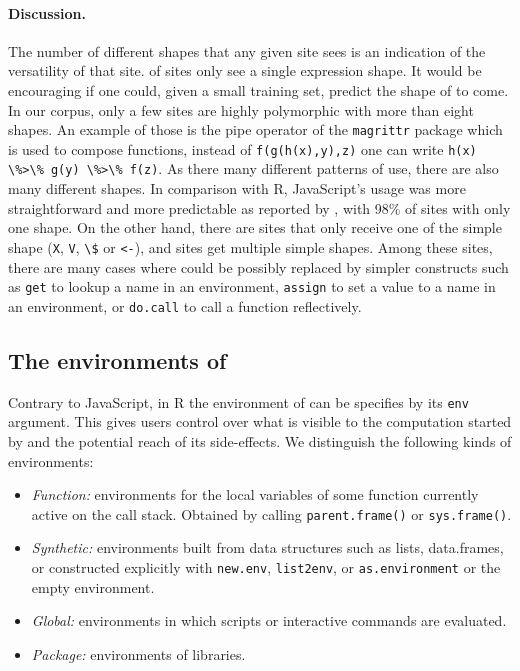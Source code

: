 \documentclass[screen,acmsmall]{acmart}%
\renewcommand{\k}[1]{\lstinline |#1|\xspace}
\begin{document}
\paragraph{Discussion.} The number of different shapes that any given
\eval site sees is an indication of the versatility of that site.
\packageNbOneMinimizedPercent of sites only see a single expression shape. It
would be encouraging if one could, given a small training set, predict the shape
of \evals to come. In our corpus, only a few sites are highly polymorphic with
more than eight shapes. An example of those is the pipe operator of the
\k{magrittr} package which is used to compose functions, \eg instead of
\k{f(g(h(x),y),z)} one can write \k{h(x) \%>\% g(y) \%>\% f(z)}. As there many
different patterns of use, there are also many different shapes. In comparison
with R, JavaScript's \eval usage was more straightforward and more predictable
as reported by \citet{oopsla12b}, with 98\% of sites with only one shape. On the
other hand, there are \packageNbSimpleMinimizedOne sites that only receive one
of the simple shape (\ie\xspace \k{X}, \k{V}, \k{\$} or \k{<-}), and
\packageNbSimpleMinimizedMore sites get multiple simple shapes. Among these
sites, there are many cases where \eval could be possibly replaced by simpler constructs
such as \k{get} to lookup a name in an environment, \k{assign} to set a value to
a name in an environment, or \k{do.call} to call a function reflectively.

\subsection{The environments of \eval}\label{sec:env}

Contrary to JavaScript, in R the environment of \eval can be specifies by its
\k{env} argument. This gives users control over what is visible to the
computation started by \eval and the potential reach of its side-effects. We
distinguish the following kinds of environments:

\begin{itemize}[---]
\item \emph{Function:} environments for the local variables of some function
  currently active on the call stack. Obtained by calling \k{parent.frame()} or
  \k{sys.frame()}.
\item \emph{Synthetic:} environments built from data structures such as lists,
  data.frames, or constructed explicitly with \k{new.env}, \k{list2env}, or
  \k{as.environment} or the empty environment.
\item \emph{Global:} environments in which scripts or interactive commands are
  evaluated.
\item \emph{Package:} environments of libraries.
\end{itemize}
\end{document}
